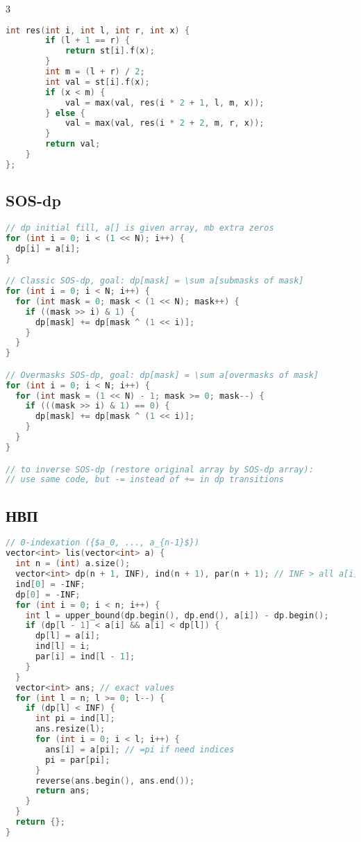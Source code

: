 \documentclass[10pt,a4paper,landscape,twosided]{extarticle}
\begin{document}
\begin{multicols*}{3}
\begin{lstlisting}[language=C++]
    int res(int i, int l, int r, int x) {
        if (l + 1 == r) {
            return st[i].f(x);
        }
        int m = (l + r) / 2;
        int val = st[i].f(x);
        if (x < m) {
            val = max(val, res(i * 2 + 1, l, m, x));
        } else {
            val = max(val, res(i * 2 + 2, m, r, x));
        }
        return val;
    }
};

\end{lstlisting}

\subsection{SOS-dp}
\begin{lstlisting}[language=C++]
// dp initial fill, a[] is given array, mb extra zeros
for (int i = 0; i < (1 << N); i++) {
  dp[i] = a[i];
}

// Classic SOS-dp, goal: dp[mask] = \sum a[submasks of mask]
for (int i = 0; i < N; i++) {
  for (int mask = 0; mask < (1 << N); mask++) {
    if ((mask >> i) & 1) {
      dp[mask] += dp[mask ^ (1 << i)];
    }
  }
}

// Overmasks SOS-dp, goal: dp[mask] = \sum a[overmasks of mask]
for (int i = 0; i < N; i++) {
  for (int mask = (1 << N) - 1; mask >= 0; mask--) {
    if (((mask >> i) & 1) == 0) {
      dp[mask] += dp[mask ^ (1 << i)];
    }
  }
}

// to inverse SOS-dp (restore original array by SOS-dp array):
// use same code, but -= instead of += in dp transitions
\end{lstlisting}

\subsection{НВП}
\begin{lstlisting}[language=C++]
// 0-indexation ({$a_0, ..., a_{n-1}$})
vector<int> lis(vector<int> a) {
  int n = (int) a.size();
  vector<int> dp(n + 1, INF), ind(n + 1), par(n + 1); // INF > all a[i] required
  ind[0] = -INF;
  dp[0] = -INF;
  for (int i = 0; i < n; i++) {
    int l = upper_bound(dp.begin(), dp.end(), a[i]) - dp.begin();
    if (dp[l - 1] < a[i] && a[i] < dp[l]) {
      dp[l] = a[i];
      ind[l] = i;
      par[i] = ind[l - 1];
    }
  }
  vector<int> ans; // exact values
  for (int l = n; l >= 0; l--) {
    if (dp[l] < INF) {
      int pi = ind[l];
      ans.resize(l);
      for (int i = 0; i < l; i++) {
        ans[i] = a[pi]; // =pi if need indices
        pi = par[pi];
      }
      reverse(ans.begin(), ans.end());
      return ans;
    }
  }
  return {};
}
\end{lstlisting}


\end{multicols*}
\end{document}
